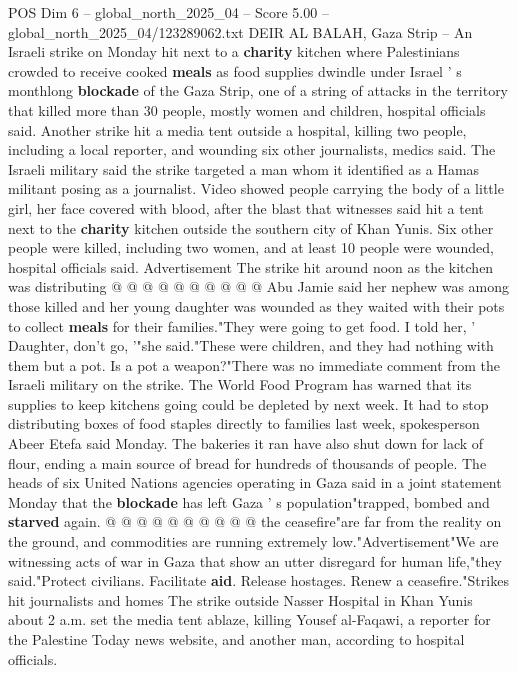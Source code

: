 \begin{textsample}{POS Dim 6 – global\_north\_2025\_04 – Score 5.00 – global\_north\_2025\_04/123289062.txt}  \label{ex:f6_pos_207}
DEIR AL BALAH, Gaza Strip -- An Israeli strike on Monday hit next to a \textbf{charity} kitchen where Palestinians crowded to receive cooked \textbf{meals} as food supplies dwindle under Israel ' s monthlong \textbf{blockade} of the Gaza Strip, one of a string of attacks in the territory that killed more than 30 people, mostly women and children, hospital officials said.
Another strike hit a media tent outside a hospital, killing two people, including a local reporter, and wounding six other journalists, medics said.
The Israeli military said the strike targeted a man whom it identified as a Hamas militant posing as a journalist.
Video showed people carrying the body of a little girl, her face covered with blood, after the blast that witnesses said hit a tent next to the \textbf{charity} kitchen outside the southern city of Khan Yunis.
Six other people were killed, including two women, and at least 10 people were wounded, hospital officials said.
Advertisement The strike hit around noon as the kitchen was distributing @ @ @ @ @ @ @ @ @ @ Abu Jamie said her nephew was among those killed and her young daughter was wounded as they waited with their pots to collect \textbf{meals} for their families."They were going to get food.
I told her, ' Daughter, don't go, '"she said."These were children, and they had nothing with them but a pot.
Is a pot a weapon?"There was no immediate comment from the Israeli military on the strike.
The World Food Program has warned that its supplies to keep kitchens going could be depleted by next week.
It had to stop distributing boxes of food staples directly to families last week, spokesperson Abeer Etefa said Monday.
The bakeries it ran have also shut down for lack of flour, ending a main source of bread for hundreds of thousands of people.
The heads of six United Nations agencies operating in Gaza said in a joint statement Monday that the \textbf{blockade} has left Gaza ' s population"trapped, bombed and \textbf{starved} again. @ @ @ @ @ @ @ @ @ @ the ceasefire"are far from the reality on the ground, and commodities are running extremely low."Advertisement"We are witnessing acts of war in Gaza that show an utter disregard for human life,"they said."Protect civilians.
Facilitate \textbf{aid}.
Release hostages.
Renew a ceasefire."Strikes hit journalists and homes The strike outside Nasser Hospital in Khan Yunis about 2 a.m. set the media tent ablaze, killing Yousef al-Faqawi, a reporter for the Palestine Today news website, and another man, according to hospital officials.

\end{textsample}

